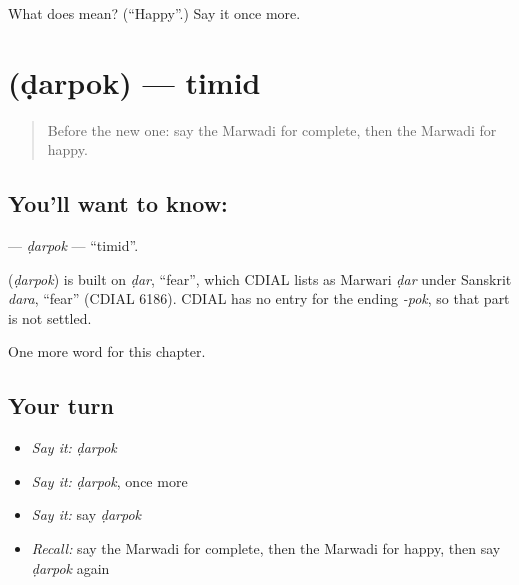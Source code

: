 \begin{tcolorbox}[breakable,colback=teal!4,colframe=teal!35!black,title={Before you move on}]
What does  mean? (\textquotedblleft{}Happy\textquotedblright{}.) Say it once more.
\end{tcolorbox}
\section[\texorpdfstring{\mw{डरपोक} (ḍarpok)}{डरपोक (ḍarpok)}]{ (ḍarpok) — timid}

\label{lesson:MW-C149-darpok}



\begin{quote}
Before the new one: say the Marwadi for complete, then the Marwadi for happy.
\end{quote}

\subsection*{You'll want to know: }
\textbf{} — \emph{ḍarpok} — \textquotedblleft{}timid\textquotedblright{}.

\begin{cousinweb}
\textbf{} (\emph{ḍarpok}) is built on \emph{ḍar}, \textquotedblleft{}fear\textquotedblright{}, which CDIAL lists as Marwari \emph{ḍar} under Sanskrit \emph{dara}, \textquotedblleft{}fear\textquotedblright{} (CDIAL 6186). CDIAL has no entry for the ending \emph{-pok}, so that part is not settled.
\end{cousinweb}

\begin{grammarlens}[title={What you've built}]
One more word for this chapter.
\end{grammarlens}

\subsection*{Your turn}
\begin{itemize}
\raggedright
  \item \emph{Say it:} \emph{ḍarpok}
  \item \emph{Say it:} \emph{ḍarpok}, once more
  \item \emph{Say it:} say \emph{ḍarpok}
  \item \emph{Recall:} say the Marwadi for complete, then the Marwadi for happy, then say \emph{ḍarpok} again
\end{itemize}

